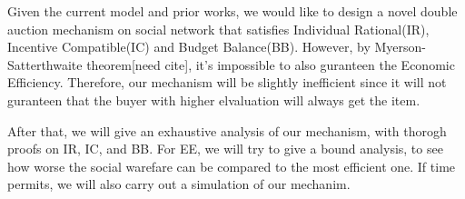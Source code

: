 Given the current model and prior works, we would like to design a novel double auction mechanism
on social network that satisfies Individual Rational(IR), Incentive Compatible(IC) and Budget Balance(BB).
However, by Myerson-Satterthwaite theorem[need cite], it's impossible to also guranteen the
Economic Efficiency. Therefore, our mechanism will be slightly inefficient since it will not
guranteen that the buyer with higher elvaluation will always get the item.\par
After that, we will give an exhaustive analysis of our mechanism, with thorogh proofs on
IR, IC, and BB. For EE, we will try to give a bound analysis, to see how worse the social warefare
can be compared to the most efficient one. If time permits, we will also carry out a simulation
of our mechanim.
